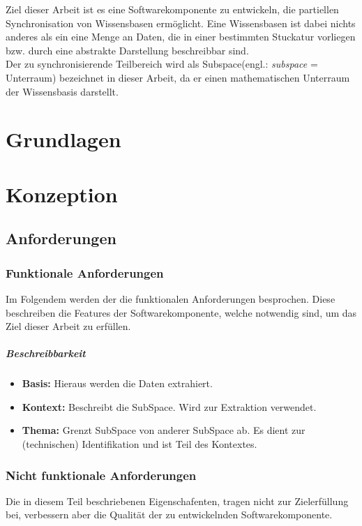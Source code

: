 \documentclass[a4paper]{article}
\begin{document}
	Ziel dieser Arbeit ist es eine Softwarekomponente zu entwickeln, die 
	partiellen Synchronisation von Wissensbasen ermöglicht. Eine Wissensbasen
	ist dabei nichts anderes als ein eine Menge an Daten, die in einer
	bestimmten Stuckatur vorliegen bzw. durch eine abstrakte Darstellung
	beschreibbar sind. \\
	Der zu synchronisierende Teilbereich wird als Subspace(engl.:
	\emph{subspace} = Unterraum) bezeichnet in dieser Arbeit, da er einen
	mathematischen Unterraum der Wissensbasis darstellt.
	
	\section{Grundlagen}	
	
	\section{Konzeption}	
	
	\subsection{Anforderungen}
	
	\subsubsection{Funktionale Anforderungen}
	
	Im Folgendem werden der die funktionalen Anforderungen besprochen. Diese
	beschreiben die Features der Softwarekomponente, welche notwendig sind,
	um das Ziel dieser Arbeit zu erfüllen.
	
	\subparagraph{Beschreibbarkeit}
	
	\begin{itemize}
		\item \textbf{Basis:} Hieraus werden die Daten extrahiert.
		\item \textbf{Kontext:} Beschreibt die SubSpace. Wird zur Extraktion
			  verwendet.
		\item \textbf{Thema:} Grenzt SubSpace von anderer SubSpace ab. Es dient 				  zur (technischen) Identifikation und ist Teil des Kontextes.
	\end{itemize} 	
	
	\subsubsection{Nicht funktionale Anforderungen}
	
	Die in diesem Teil beschriebenen Eigenschafenten, tragen nicht zur
	Zielerfüllung bei, verbessern aber die Qualität der zu entwickelnden
	Softwarekomponente.
	
	\newpage
	\listoffigures
	\newpage
	\listoftables
\end{document}
